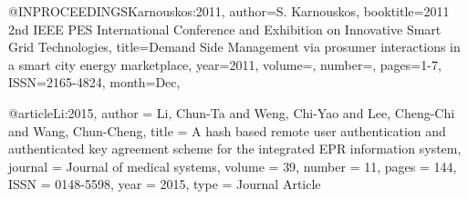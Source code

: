 @INPROCEEDINGS{Karnouskos:2011, 
author={S. Karnouskos}, 
booktitle={2011 2nd IEEE PES International Conference and Exhibition on Innovative Smart Grid Technologies}, 
title={Demand Side Management via prosumer interactions in a smart city energy marketplace}, 
year={2011}, 
volume={}, 
number={}, 
pages={1-7}, 
ISSN={2165-4824}, 
month={Dec},}

@article{Li:2015,
   author = {Li, Chun-Ta and Weng, Chi-Yao and Lee, Cheng-Chi and Wang, Chun-Cheng},
   title = {A hash based remote user authentication and authenticated key agreement scheme for the integrated EPR information system},
   journal = {Journal of medical systems},
   volume = {39},
   number = {11},
   pages = {144},
   ISSN = {0148-5598},
   year = {2015},
   type = {Journal Article}
}

